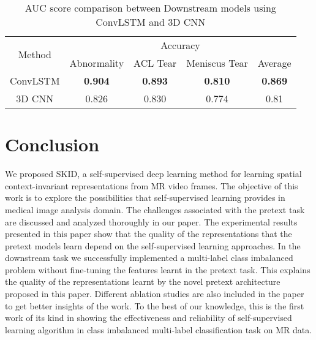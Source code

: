 \documentclass[journal]{IEEEtai}
\begin{document}
\begin{table}[!h]
    \centering
    \bgroup
    \caption{AUC score comparison between Downstream models using ConvLSTM and 3D CNN}
    \def\arraystretch{1.8}
    \begin{tabular}{c|c|c|c|c}
    \hline
        \multirow{2}{1.2cm}{\centering Method} & \multicolumn{4}{c}{\centering Accuracy}\\ \cline{2-5}
        {} & Abnormality & ACL Tear & Meniscus Tear & Average\\  
        \hline \hline
ConvLSTM & \textbf{0.904} & \textbf{0.893} & \textbf{0.810} & \textbf{0.869}\\ \hline
        3D CNN & 0.826 & 0.830 & 0.774 & 0.81 \\ \hline
         
    \end{tabular}
    \label{tab:comp_auc_convlstm_3dcnn}
    \egroup
\end{table}


\section{Conclusion}
\label{sec:conclusion}

\indent We proposed SKID, a self-supervised deep learning method for learning spatial context-invariant representations from MR video frames. The objective of this work is to explore the possibilities that self-supervised learning provides in medical image analysis domain. The challenges associated with the pretext task are discussed and analyzed thoroughly in our paper. The experimental results presented in this paper show that the quality of the representations that the pretext models learn depend on the self-supervised learning approaches. In the downstream task we successfully implemented a multi-label class imbalanced problem without fine-tuning the features learnt in the pretext task. This explains the quality of the representations learnt by the novel pretext architecture proposed in this paper. Different ablation studies are also included in the paper to get better insights of the work. To the best of our knowledge, this is the first work of its kind in showing the effectiveness and reliability of self-supervised learning algorithm in class imbalanced multi-label classification task on MR data.
\end{document}
